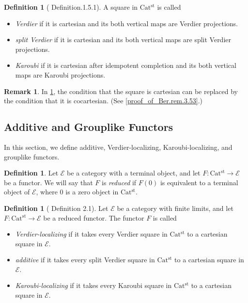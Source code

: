 \documentclass[a4paper,dvipdfmx,11pt,reqno]{amsart}
\newcommand{\E}{\mathcal{E}}
\newcommand{\Catst}{\mathrm{Cat^{st}}}
\theoremstyle{definition}
\newtheorem{definition}[theorem]{Definition}
\newtheorem{remark}[theorem]{Remark}
\begin{document}
\begin{definition}[\cite{CDH23} Definition.1.5.1] \label{CDH23.def.1.5.1}
  A square in $\Catst$ is called
  \begin{itemize}
    \item \textit{Verdier} if it is cartesian and its both vertical maps are Verdier projections.
    \item \textit{split Verdier} if it is cartesian and its both vertical maps are split Verdier projections.
    \item \textit{Karoubi} if it is cartesian after idempotent completion and its both vertical maps are Karoubi projections.
  \end{itemize}
\end{definition}

\begin{remark} \label{Ber.rem.3.53}
  In \cref{CDH23.def.1.5.1}, the condition that the square is cartesian can be replaced by the condition that it is cocartesian.
  (See \cref{proof_of_Ber.rem.3.53}.)
\end{remark}


\subsection{Additive and Grouplike Functors}

In this section, we define additive, Verdier-localizing, Karoubi-localizing, and grouplike functors. 

\begin{definition}
  Let $\E$ be a category with a terminal object, and let $F : \Catst \to \E$ be a functor.
  We will say that $F$ is \textit{reduced} if $F(0)$ is equivalent to a terminal object of $\E$, where $0$ is a zero object in $\Catst$.
\end{definition}

\begin{definition}[\cite{HLS23} Definition 2.1] \label{HLS23.def.2.1} %
  Let $\E$ be a category with finite limits, and let $F : \Catst \to \E$ be a reduced functor.
  The functor $F$ is called 
  \begin{itemize}
    \item \textit{Verdier-localizing} if it takes every Verdier square in $\Catst$ to a cartesian square in $\E$.
    \item \textit{additive} if it takes every split Verdier square in $\Catst$ to a cartesian square in $\E$.
    \item \textit{Karoubi-localizing} if it takes every Karoubi square in $\Catst$ to a cartesian square in $\E$.
  \end{itemize}
\end{definition}
\end{document}
